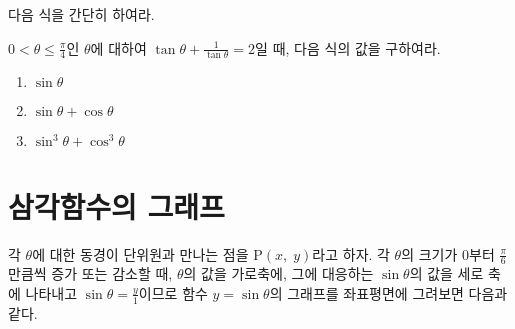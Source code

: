 \documentclass[11pt, a4paper]{book}
\begin{document}
\begin{problem}
	다음 식을 간단히 하여라.
\end{problem}

\vspace{1em}
\begin{problem}
	$0<\theta \le \frac{\pi}{4}$인 $\theta$에 대하여 $\tan\theta +\frac{1}{\tan\theta}=2$일 때, 다음 식의 값을 구하여라.
	\begin{enumerate}[label=(\arabic*)]
		\item $\sin\theta$
		\item $\sin\theta +\cos\theta$
		\item $\sin^3\theta +\cos^3\theta$
	\end{enumerate}
\end{problem}

\newpage
\section{삼각함수의 그래프}

각 $\theta$에 대한 동경이 단위원과 만나는 점을 $\textrm{P}(x,\;y)$라고 하자. 각 $\theta$의 크기가 $0$부터 $\frac{\pi}{6}$만큼씩 증가 또는 감소할 때, $\theta$의 값을 가로축에, 그에 대응하는 $\sin\theta$의 값을 세로 축에 나타내고 $\sin\theta = \frac{y}{1}$이므로 함수 $y=\sin\theta$의 그래프를  좌표평면에 그려보면 다음과 같다. 
\end{document}
